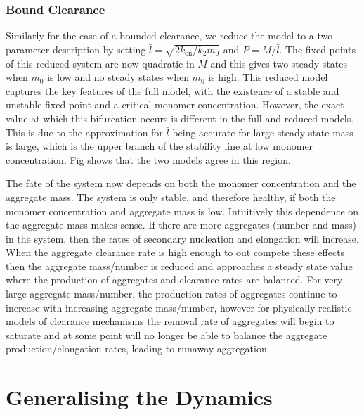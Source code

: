 \subsubsection{Bound Clearance}

Similarly for the case of a bounded clearance, we reduce the model to a two parameter description by setting $\bar{l} = \sqrt{2 k_\text{on}/k_2 m_0}$ and $P=M/\bar{l}$. The fixed points of this reduced system are now quadratic in $M$ and this gives two steady states when $m_0$ is low and no steady states when $m_0$ is high. This reduced model captures the key features of the full model, with the existence of a stable and unstable fixed point and a critical monomer concentration. However, the exact value at which this bifurcation occurs is different in the full and reduced models. This is due to the approximation for $\bar{l}$ being accurate for large steady state mass is large, which is the upper branch of the stability line at low monomer concentration. Fig  shows that the two models agree in this region.

The fate of the system now depends on both the monomer concentration and the aggregate mass. The system is only stable, and therefore healthy, if both the monomer concentration and aggregate mass is low. Intuitively this dependence on the aggregate mass makes sense. If there are more aggregates (number and mass) in the system, then the rates of secondary nucleation and elongation will increase. When the aggregate clearance rate is high enough to out compete these effects then the aggregate mass/number is reduced and approaches a steady state value where the production of aggregates and clearance rates are balanced. For very large aggregate mass/number, the production rates of aggregates continue to increase with increasing aggregate mass/number, however for physically realistic models of clearance mechanisms the removal rate of aggregates will begin to saturate and at some point will no longer be able to balance the aggregate production/elongation rates, leading to runaway aggregation.


\section{Generalising the Dynamics}


